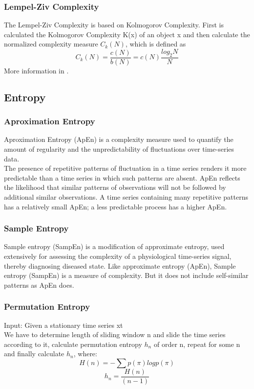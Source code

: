 \documentclass[twoside, english]{article}
\begin{document}
\begin{multicols}{2}
\subsubsection{Lempel-Ziv Complexity}
The Lempel-Ziv Complexity is based on Kolmogorov Complexity. First is calculated the Kolmogorov Complexity K(x) of an object x and then calculate the normalized complexity measure \(C_{k}(N)\), which is defined as
\begin{equation}
\label{eq:kolmogorovnormalized}
C_{k}(N) = \frac{c(N)}{b(N)} = c(N)\frac{log_2 N}{N}
\end{equation}
More information in \cite{article:EasilyAdaptableComplexityMeasure}.

\subsection{Entropy}
\subsubsection{Aproximation Entropy}
Aproximation Entropy (ApEn) is a complexity measure used to quantify the amount of regularity and the unpredictability of fluctuations over time-series data.\\
The presence of repetitive patterns of fluctuation in a time series renders it more predictable than a time series in which such patterns are absent. ApEn reflects the likelihood that similar patterns of observations will not be followed by additional similar observations. A time series containing many repetitive patterns has a relatively small ApEn; a less predictable process has a higher ApEn.

\subsubsection{Sample Entropy}
Sample entropy (SampEn) is a modification of approximate entropy, used extensively for assessing the complexity of a physiological time-series signal, thereby diagnosing diseased state. Like approximate entropy (ApEn), Sample entropy (SampEn) is a measure of complexity. But it does not include self-similar patterns as ApEn does.

\subsubsection{Permutation Entropy}
Input: Given a stationary time series {xt}\\
We have to determine length of sliding window n and slide the time series according to it, calculate permutation entropy \(h_{n}\) of order n, repeat for some n and finally calculate \(h_{n}\), where:
\[H(n) = -\sum p(\pi)log p(\pi)\]
\[h_{n} = \frac{H(n)}{(n-1)}\]


\end{multicols}
\end{document}
